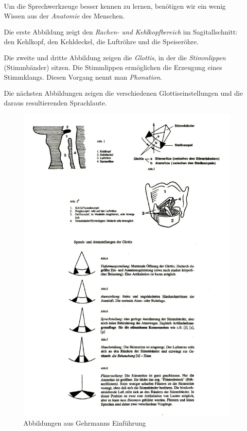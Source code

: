 \documentclass[
  letterpaper,
]{scrbook}
\begin{document}
Um die Sprechwerkzeuge besser kennen zu lernen, benötigen wir ein wenig
Wissen aus der \emph{Anatomie} des Menschen.

Die erste Abbildung zeigt den \emph{Rachen- und Kehlkopfbereich} im
Sagitallschnitt: den Kehlkopf, den Kehldeckel, die Luftröhre und die
Speiseröhre.

Die zweite und dritte Abbildung zeigen die \emph{Glottis}, in der die
\emph{Stimmlippen} (Stimmbänder) sitzen. Die Stimmlippen ermöglichen die
Erzeugung eines Stimmklangs. Diesen Vorgang nennt man \emph{Phonation}.

Die nächsten Abbildungen zeigen die verschiedenen Glottiseinstellungen
und die daraus resultierenden Sprachlaute.

\begin{figure}

{\centering \includegraphics[width=1\textwidth,height=\textheight]{./pictures/02a_Gehrmann-Sprechwerkzeuge_Vokale_page-0001.jpg}

}

\caption{Abbildungen aus Gehrmanns Einführung}

\end{figure}
\end{document}
